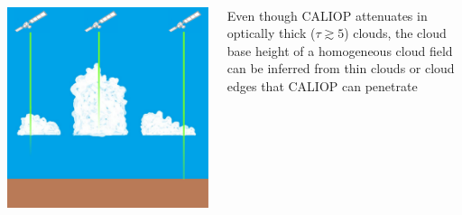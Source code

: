 \documentclass[final,t,12pt]{beamer}\usepackage[]{graphicx}\usepackage[]{color}
\begin{document}
\begin{frame}[fragile]{}
\begin{tcolorbox}
\begin{tcbitemize}[raster equal height=rows, raster columns = 11
      ]
\begin{tcbitemize}[raster columns=1]
        \tcbitem[title={Method}] 
        ~\vfill
          \begin{columns}[T]
            \begin{column}{0.5\linewidth}
              \includegraphics[width=\linewidth,keepaspectratio=true]{CloudFieldCALIOP.pdf}
            \end{column}
            \begin{column}{0.5\linewidth}
              Even though CALIOP attenuates in optically thick ($\tau \gtrsim 5$)
              clouds, the cloud base height of a homogeneous cloud field can be
              inferred from thin clouds or cloud edges that CALIOP can penetrate
            \end{column}
          \end{columns}
        \vfill~


\end{tcbitemize}
\end{tcbitemize}
\end{tcolorbox}
\end{frame}
\end{document}
